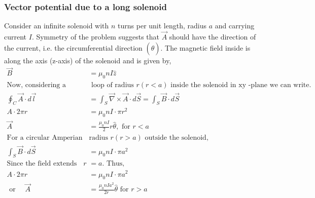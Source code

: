 \subsubsection{Vector potential due to a long solenoid}
Consider an infinite solenoid with $n$ turns per unit length, radius $a$ and carrying current $I .$ Symmetry of the problem suggests that $\vec{A}$ should have the direction of the current, i.e. the circumferential direction $(\hat{\theta})$. The magnetic field inside is along the axis (z-axis) of the solenoid and is given by,
\begin{align*}
\vec{B}&=\mu_{0} n I \hat{z}\\
\text{Now, considering a circular Amperian}&\text{  loop of radius $r(r<a)$ inside the solenoid in $\mathrm{xy}$ -plane we can write.}\\
\oint_{C} \vec{A} \cdot d \vec{l}&=\int_{S} \vec{\nabla} \times \vec{A} \cdot d \vec{S}=\int_{S} \vec{B} \cdot d \vec{S} \\
A \cdot 2 \pi r&=\mu_{0} n I \cdot \pi r^{2} \\
\vec{A}&=\frac{\mu_{0} n I}{2} r \hat{\theta}, \text { for } r<a\\
\text{For a circular Amperian loop of }&\text{radius $r(r>a)$ outside the solenoid,}\\
\int_{S} \vec{B} \cdot d \vec{S}&=\mu_{0} n I \cdot \pi a^{2}\\
\text{Since the field extends only up to $r$}&=a.\text{ Thus,}\\
A \cdot 2 \pi r&=\mu_{0} n I \cdot \pi a^{2} \\\text { or }\quad \vec{A}&=\frac{\mu_{0} n I a^{2}}{2 r} \hat{\theta} \text { for } r>a
\end{align*}
